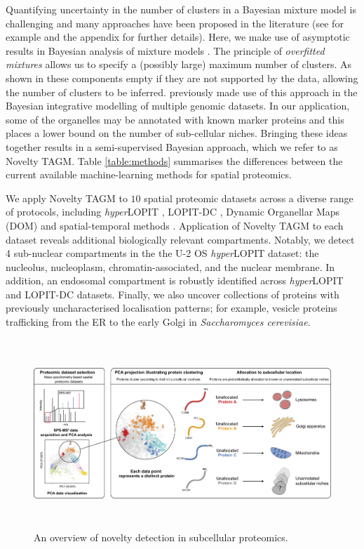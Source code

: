 \documentclass[12pt,english]{article}
\begin{document}
Quantifying uncertainty in the number of clusters in a Bayesian mixture model is challenging and many approaches have been proposed in the literature (see for example \cite{ferguson::1974, antoniak::1974, Richardson::1997} and the appendix for further details). Here, we make use of asymptotic results in Bayesian analysis of mixture models \citep{Rousseau::2011}. The principle of \textit{overfitted mixtures} allows us to specify a (possibly large) maximum number of clusters. As shown in \cite{Rousseau::2011} these components empty if they are not supported by the data, allowing the number of clusters to be inferred. \cite{Kirk:2012} previously made use of this approach in the Bayesian integrative modelling of multiple genomic datasets. In our application, some of the organelles may be annotated with known marker proteins and this places a lower bound on the number of sub-cellular niches. Bringing these ideas together results in a semi-supervised Bayesian approach, which we refer to as Novelty TAGM. Table \ref{table:methods} summarises the differences between the current available machine-learning methods for spatial proteomics.

We apply Novelty TAGM to $10$ spatial proteomic datasets across a diverse range of protocols, including \textit{hyper}LOPIT \citep{hyper, Mulvey:2017}, LOPIT-DC \citep{DC:2018}, Dynamic Organellar Maps (DOM) \citep{Itzhak:2016} and spatial-temporal methods \citep{Jean_Beltran:2016}. Application of Novelty TAGM to each dataset reveals additional biologically relevant compartments. Notably, we detect 4 sub-nuclear compartments in the the U-2 OS \textit{hyper}LOPIT dataset: the nucleolus,  nucleoplasm, chromatin-associated, and the nuclear membrane. In addition, an endosomal compartment is robustly identified across \textit{hyper}LOPIT and LOPIT-DC datasets. Finally, we also uncover collections of proteins with previously uncharacterised localisation patterns; for example, vesicle proteins trafficking from the ER to the early Golgi in \textit{Saccharomyces cerevisiae}.

\begin{figure}[h]
	
	\centering
	\includegraphics[height=2.8in]{IMG_Protein_Allocation_Final.png}
	\caption{An overview of novelty detection in subcellular proteomics.}
	\label{figure:overview}
\end{figure}
\end{document}
